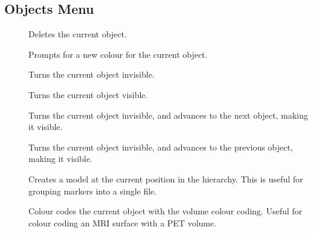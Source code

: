 \subsection{Objects Menu}

\begin{description}
\item[]  Deletes the current
        object.
\item[]  Prompts for a new colour for the
        current object.
\item[]  Turns the current object invisible.
\item[]  Turns the current object visible.
\item[]  Turns the current object invisible,
               and advances to the next object, making it visible.
\item[]  Turns the current object invisible,
               and advances to the previous object, making it visible.
\item[]  Creates a model at the current
               position in the hierarchy.  This is useful for grouping
               markers into a single file.
\item[]  Colour codes the current object
               with the volume colour coding.  Useful for colour coding an
               MRI surface with a PET volume.
\end{description}


